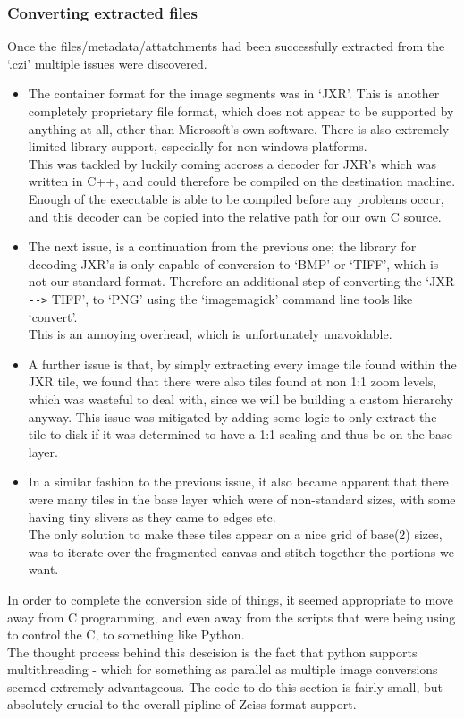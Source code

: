 \subsubsection{Converting extracted files}
Once the files/metadata/attatchments had been successfully extracted from the `.czi' multiple issues were
discovered.
\begin{itemize}
	\item The container format for the image segments was in `JXR'. This is another completely proprietary
	file format, which does not appear to be supported by anything at all, other than Microsoft's own software.
	There is also extremely limited library support, especially for non-windows platforms.\\
	This was tackled by luckily coming accross a decoder for JXR's which was written in C++, and could therefore
	be compiled on the destination machine. Enough of the executable is able to be compiled before any problems
	occur, and this decoder can be copied into the relative path for our own C source.
	\item The next issue, is a continuation from the previous one; the library for decoding JXR's is only
	capable of conversion to `BMP' or `TIFF', which is not our standard format. Therefore an additional step of
	converting the `JXR \verb|-->| TIFF', to `PNG' using the `imagemagick' command line tools like `convert'.\\
	This is an annoying overhead, which is unfortunately unavoidable.
	\item A further issue is that, by simply extracting every image tile found within the JXR tile, we found that
	there were also tiles found at non 1:1 zoom levels, which was wasteful to deal with, since we will be building
	a custom hierarchy anyway. This issue was mitigated by adding some logic to only extract the tile to disk if
	it was determined to have a 1:1 scaling and thus be on the base layer.
	\item In a similar fashion to the previous issue, it also became apparent that there were many tiles in the
	base layer which were of non-standard sizes, with some having tiny slivers as they came to edges etc.\\ The
	only solution to make these tiles appear on a nice grid of base(2) sizes, was to iterate over the fragmented
	canvas and stitch together the portions we want.\\
\end{itemize}
In order to complete the conversion side of things, it seemed appropriate to move away from C programming, and
even away from the scripts that were being using to control the C, to something like Python.\\
The thought process behind this descision is the fact that python supports multithreading - which for something
as parallel as multiple image conversions seemed extremely advantageous. The code to do this section is fairly
small, but absolutely crucial to the overall pipline of Zeiss format support.\\

